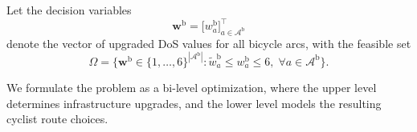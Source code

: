 \documentclass[lettersize,journal]{IEEEtran}
\begin{document}
Let the decision variables
\begin{equation}
    \boldsymbol{w}^\mathrm{b} = \big[w_{a}^\mathrm{b}\big]_{a \in \mathcal{A}^\mathrm{b}}^\top
\end{equation}
denote the vector of upgraded DoS values for all bicycle arcs, with the feasible set
\begin{equation}
    \Omega = \Big\{\boldsymbol{w}^\mathrm{b} \in \{1,\dots,6\}^{|\mathcal{A}^\mathrm{b}|} :
    \tilde{w}_a^\mathrm{b} \leq w_a^\mathrm{b} \leq 6, \;\forall a \in \mathcal{A}^\mathrm{b} \Big\}.
\end{equation}



We formulate the problem as a bi-level optimization, where the upper level determines infrastructure upgrades, and the lower level models the resulting cyclist route choices.
\end{document}
